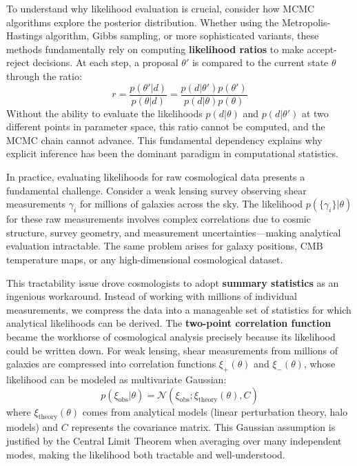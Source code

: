 \documentclass[11pt,a4paper]{article}
\theoremstyle{definition}
\begin{document}
To understand why likelihood evaluation is crucial, consider how MCMC algorithms explore the posterior distribution. Whether using the Metropolis-Hastings algorithm, Gibbs sampling, or more sophisticated variants, these methods fundamentally rely on computing \textbf{likelihood ratios} to make accept-reject decisions. At each step, a proposal $\theta'$ is compared to the current state $\theta$ through the ratio:
\begin{equation}
    r = \frac{p(\theta'|d)}{p(\theta|d)} = \frac{p(d|\theta')p(\theta')}{p(d|\theta)p(\theta)}
\end{equation}
Without the ability to evaluate the likelihoods $p(d|\theta)$ and $p(d|\theta')$ at two different points in parameter space, this ratio cannot be computed, and the MCMC chain cannot advance. This fundamental dependency explains why explicit inference has been the dominant paradigm in computational statistics.

In practice, evaluating likelihoods for raw cosmological data presents a fundamental challenge. Consider a weak lensing survey observing shear measurements $\gamma_{i}$ for millions of galaxies across the sky. The likelihood $p(\{\gamma_i\}|\theta)$ for these raw measurements involves complex correlations due to cosmic structure, survey geometry, and measurement uncertainties—making analytical evaluation intractable. The same problem arises for galaxy positions, CMB temperature maps, or any high-dimensional cosmological dataset.

This tractability issue drove cosmologists to adopt \textbf{summary statistics} as an ingenious workaround. Instead of working with millions of individual measurements, we compress the data into a manageable set of statistics for which analytical likelihoods can be derived. The \textbf{two-point correlation function} became the workhorse of cosmological analysis precisely because its likelihood could be written down. For weak lensing, shear measurements from millions of galaxies are compressed into correlation functions $\xi_+(\theta)$ and $\xi_-(\theta)$, whose likelihood can be modeled as multivariate Gaussian:
\begin{equation}
    p(\xi_{\text{obs}}|\theta) = \mathcal{N}(\xi_{\text{obs}}; \xi_{\text{theory}}(\theta), C)
\end{equation}
where $\xi_{\text{theory}}(\theta)$ comes from analytical models (linear perturbation theory, halo models) and $C$ represents the covariance matrix. This Gaussian assumption is justified by the Central Limit Theorem when averaging over many independent modes, making the likelihood both tractable and well-understood.
\end{document}
